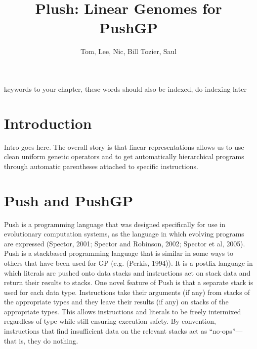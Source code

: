 %
\title*{Plush: Linear Genomes for PushGP}
\author{Tom, Lee, Nic, Bill Tozier, Saul}

\maketitle


\begin{keywords}
keywords to your chapter, these words should also be indexed, do indexing later
\end{keywords}

\section{Introduction}
\label{Introduction}

Intro goes here. The overall story is that linear representations allows us to use clean uniform genetic operators and to get automatically hierarchical programs through automatic parentheses attached to specific instructions.



\section{Push and PushGP}

Push is a programming language that was designed specifically for use in evolutionary
computation systems, as the language in which evolving programs are expressed
(Spector, 2001; Spector and Robinson, 2002; Spector et al, 2005). Push is a stackbased
programming language that is similar in some ways to others that have been
used for GP (e.g. (Perkis, 1994)). It is a postfix language in which literals are pushed
onto data stacks and instructions act on stack data and return their results to stacks.
One novel feature of Push is that a separate stack is used for each data type. Instructions
take their arguments (if any) from stacks of the appropriate types and they
leave their results (if any) on stacks of the appropriate types. This allows instructions
and literals to be freely intermixed regardless of type while still ensuring execution
safety. By convention, instructions that find insufficient data on the relevant stacks
act as “no-ops”—that is, they do nothing.

